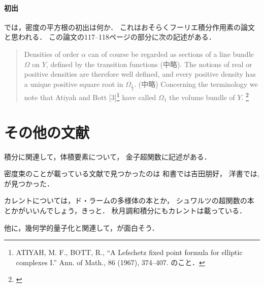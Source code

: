 \paragraph{初出\cite{Hor71}}
では，密度の平方根の初出は何か．
これはおそらくフーリエ積分作用素の論文\cite{Hor71}と思われる．
この論文の117--118ページの部分に次の記述がある．
\begin{quotation}
    Densities of order \(\alpha\) can of course be regarded 
    as sections of a line bundle \(\varOmega\) on \(Y\), 
    defined by the transition functions (中略). 
    The notions of real or positive densities are 
    therefore well defined, 
    and every positive density has 
    a unique positive square root in \(\varOmega_{\frac{1}{2}}\). 
    (中略)
    Concerning the terminology 
    we note that Atiyah and Bott [3]\footnote{
        ATIYAH, M. F., BOTT, R., 
        ``A Lefschetz fixed point formula 
        for elliptic complexes I.'' Ann. of Math., 86 (1967), 374--407. のこと．
    } have called \(\varOmega_1\) 
    the volume bundle of \(Y\).
    \footnote{\cite[p.117-118]{Hor71}}
\end{quotation}



\section*{その他の文献}
積分に関連して，体積要素について，
金子超関数\cite[参考4.2 (p.161), 参考4.3 (p.165)]{K96}に記述がある．


密度束のことが載っている文献で見つかったのは
和書では吉田朋好\cite[2.3.3項 (p.46--48)]{Y98}，
洋書では\cite[p.29]{BGV92}, \cite[p.427--434]{L13}が見つかった．

カレントについては，ド・ラームの多様体の本とか，
シュワルツの超関数の本とかがいいんでしょう，きっと．
秋月調和積分にもカレントは載っている．

他に，幾何学的量子化と関連して，\cite{BW97}が面白そう．




